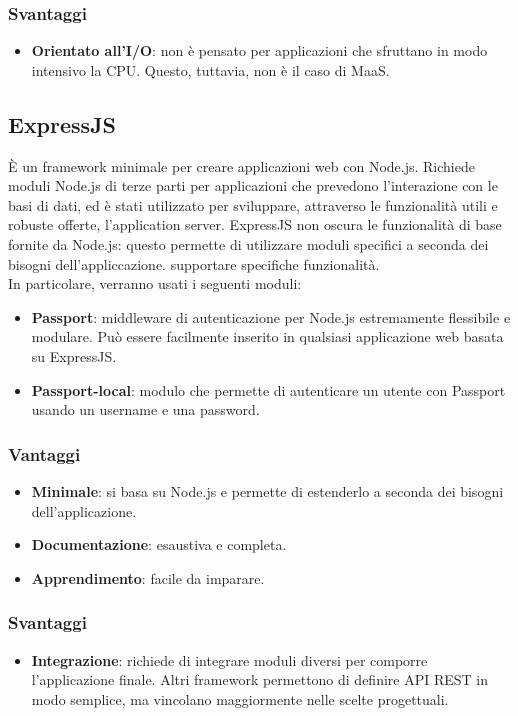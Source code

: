 \subsubsection{Svantaggi}
\begin{itemize}
\item \textbf{Orientato all'I/O}: non \`e pensato per applicazioni che sfruttano in modo intensivo la CPU. Questo, tuttavia, non \`e il caso di MaaS.
\end{itemize}
\subsection{ExpressJS}
È un framework minimale per creare applicazioni web con Node.js. Richiede moduli Node.js di terze parti per applicazioni che prevedono l’interazione con le basi di dati, ed è stati utilizzato per sviluppare, attraverso le funzionalità utili e robuste offerte, l’application server. ExpressJS non oscura le funzionalità di base fornite da Node.js: questo permette di utilizzare moduli specifici a seconda dei bisogni dell'appliccazione.
supportare specifiche funzionalità. \\
In particolare, verranno usati i seguenti moduli:
\begin{itemize}
\item \textbf{Passport}: middleware di autenticazione per Node.js estremamente flessibile e modulare. Può essere facilmente inserito in qualsiasi applicazione web basata su
ExpressJS.
\item \textbf{Passport-local}: modulo che permette di autenticare un utente con Passport usando un username e una password.
\end{itemize}
\subsubsection{Vantaggi}
\begin{itemize}
\item \textbf{Minimale}: si basa su Node.js e permette di estenderlo a seconda dei bisogni dell'applicazione.
\item \textbf{Documentazione}: esaustiva e completa.
\item \textbf{Apprendimento}: facile da imparare.
\end{itemize}
\subsubsection{Svantaggi}
\begin{itemize}
\item \textbf{Integrazione}: richiede di integrare moduli diversi per comporre l'applicazione finale. Altri framework permettono di definire API REST in modo semplice, ma vincolano maggiormente nelle scelte progettuali.
\end{itemize}
